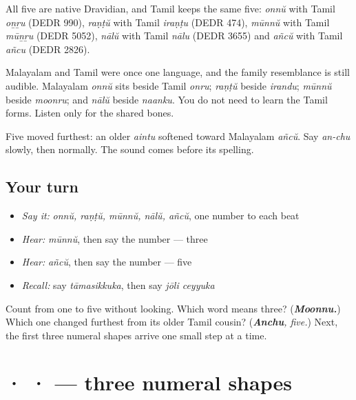 \begin{cousinweb}
All five are native Dravidian, and Tamil keeps the same five: \emph{onnŭ} with Tamil \emph{oṉṟu} (DEDR 990), \emph{raṇṭŭ} with Tamil \emph{iraṇṭu} (DEDR 474), \emph{mūnnŭ} with Tamil \emph{mūṉṟu} (DEDR 5052), \emph{nālŭ} with Tamil \emph{nālu} (DEDR 3655) and \emph{añcŭ} with Tamil \emph{añcu} (DEDR 2826).
\end{cousinweb}

\begin{culture}
Malayalam and Tamil were once one language, and the family resemblance is still audible. Malayalam \emph{onnŭ} sits beside Tamil \emph{onru}; \emph{raṇṭŭ} beside \emph{irandu}; \emph{mūnnŭ} beside \emph{moonru}; and \emph{nālŭ} beside \emph{naanku}. You do not need to learn the Tamil forms. Listen only for the shared bones.
\end{culture}

\begin{culture}
Five moved furthest: an older \emph{aintu} softened toward Malayalam \emph{añcŭ}. Say \emph{an-chu} slowly, then normally. The sound comes before its spelling.
\end{culture}

\subsection*{Your turn}
\begin{itemize}
\raggedright
  \item \emph{Say it:} \emph{onnŭ, raṇṭŭ, mūnnŭ, nālŭ, añcŭ}, one number to each beat
  \item \emph{Hear:} \emph{mūnnŭ}, then say the number — three
  \item \emph{Hear:} \emph{añcŭ}, then say the number — five
  \item \emph{Recall:} say \emph{tāmasikkuka}, then say \emph{jōli ceyyuka}
\end{itemize}

\begin{tcolorbox}[breakable,colback=teal!4,colframe=teal!35!black,title={Before you move on}]
Count from one to five without looking. Which word means three? (\emph{\textbf{Moonnu.}}) Which one changed furthest from its older Tamil cousin? (\emph{\textbf{Anchu}, five.}) Next, the first three numeral shapes arrive one small step at a time.
\end{tcolorbox}
\section[\texorpdfstring{\ml{൧} \ml{൨} \ml{൩} (one, two, three)}{൧ ൨ ൩ (one, two, three)}]{ ·  ·  — three numeral shapes}

